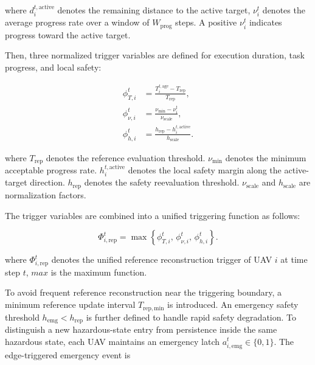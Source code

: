 \noindent
where $d_i^{t,\mathrm{active}}$ denotes the remaining distance to the active target, 
$\nu_i^t$ denotes the average progress rate over a window of $W_{\mathrm{prog}}$ steps.
A positive $\nu_i^t$ indicates progress toward the active target.

Then, three normalized trigger variables are defined for execution duration, task progress, and local safety:

\begin{equation}
    \label{eq:reference_trigger_variables}
    \begin{aligned}
        \phi_{T,i}^t
        &=
        \frac{
        T_i^{t,\mathrm{age}}-T_{\mathrm{rep}}
        }{
        T_{\mathrm{rep}}
        },\\
        \phi_{\nu,i}^t
        &=
        \frac{
        \nu_{\min}-\nu_i^t
        }{
        \nu_{\mathrm{scale}}
        },\\
        \phi_{h,i}^t
        &=
        \frac{
        h_{\mathrm{rep}}-h_i^{t,\mathrm{active}}
        }{
        h_{\mathrm{scale}}
        }.
    \end{aligned}
\end{equation}

\noindent
where $T_{\mathrm{rep}}$ denotes the reference evaluation threshold.
$\nu_{\min}$ denotes the minimum acceptable progress rate.
$h_i^{t,\mathrm{active}}$ denotes the local safety margin along the active-target direction.
$h_{\mathrm{rep}}$ denotes the safety reevaluation threshold.
$\nu_{\mathrm{scale}}$ and $h_{\mathrm{scale}}$ are normalization factors.

The trigger variables are combined into a unified triggering function as follows:

\begin{equation}
    \label{eq:event_reproposal_surface}
    \Phi_{i,\mathrm{rep}}^t
    =
    \max
    \left\{
    \phi_{T,i}^t,\,
    \phi_{\nu,i}^t,\,
    \phi_{h,i}^t
    \right\}.
\end{equation}

\noindent
where $\Phi_{i,\mathrm{rep}}^t$ denotes the unified reference reconstruction trigger of UAV $i$ at time step $t$, $max$ is the maximum function.

To avoid frequent reference reconstruction near the triggering boundary, a minimum reference update interval $T_{\mathrm{rep,min}}$ is introduced. An emergency safety threshold $h_{\mathrm{emg}}<h_{\mathrm{rep}}$ is further defined to handle rapid safety degradation. To distinguish a new hazardous-state entry from persistence inside the same hazardous state, each UAV maintains an emergency latch $a_{i,\mathrm{emg}}^t\in\{0,1\}$. The edge-triggered emergency event is


